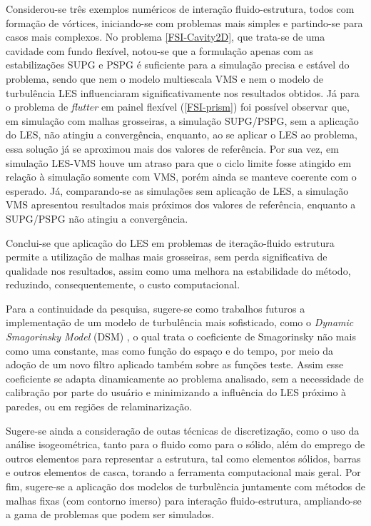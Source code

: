 Considerou-se três exemplos numéricos de interação fluido-estrutura, todos com formação de vórtices, iniciando-se com problemas mais simples e partindo-se para casos mais complexos. No problema \ref{FSI-Cavity2D}, que trata-se de uma cavidade com fundo flexível, notou-se que a formulação apenas com as estabilizações SUPG e PSPG é suficiente para a simulação precisa e estável do problema, sendo que nem o modelo multiescala VMS e nem o modelo de turbulência LES influenciaram  significativamente nos resultados obtidos. Já para o problema de \textit{flutter} em painel flexível (\ref{FSI-prism}) foi possível observar que, em simulação com malhas grosseiras, a simulação SUPG/PSPG, sem a aplicação do LES, não atingiu a convergência, enquanto, ao se aplicar o LES ao problema, essa solução já se aproximou mais dos valores de referência. Por sua vez, em simulação LES-VMS houve um atraso para que o ciclo limite fosse atingido em relação à simulação somente com VMS, porém ainda se manteve coerente com o esperado. Já, comparando-se as simulações sem aplicação de LES, a simulação VMS apresentou resultados mais próximos dos valores de referência, enquanto a SUPG/PSPG não atingiu a convergência.

Conclui-se que aplicação do LES em problemas de iteração-fluido estrutura permite a utilização de malhas mais grosseiras, sem perda significativa de qualidade nos resultados, assim como uma melhora na estabilidade do método, reduzindo, consequentemente, o custo computacional.

Para a continuidade da pesquisa, sugere-se como trabalhos futuros a implementação de um modelo de turbulência mais sofisticado, como o \textit{Dynamic Smagorinsky Model} (DSM) \cite{germano1991dynamic}, o qual trata o coeficiente de Smagorinsky não mais como uma constante, mas como função do espaço e do tempo, por meio da adoção de um novo filtro aplicado também sobre as funções teste. Assim esse coeficiente se adapta dinamicamente ao problema analisado, sem a necessidade de calibração por parte do usuário e minimizando a influência do LES próximo à paredes, ou em regiões de relaminarização.

Sugere-se ainda a consideração de outas técnicas de discretização, como o uso da análise isogeométrica, tanto para o fluido como para o sólido, além do emprego de outros elementos para representar a estrutura, tal como elementos sólidos, barras e outros elementos de casca, torando a ferramenta computacional mais geral. Por fim, sugere-se a aplicação dos modelos de turbulência juntamente com métodos de malhas fixas (com contorno imerso) para interação fluido-estrutura, ampliando-se a gama de problemas que podem ser simulados.